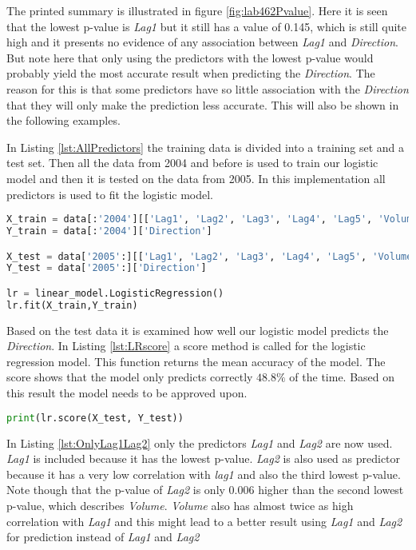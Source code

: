 \FloatBarrier

The printed summary is illustrated in figure \ref{fig:lab462Pvalue}. Here it is  seen that the lowest p-value is \emph{Lag1} but it still has a value of 0.145, which is still quite high and it presents no evidence of any association between \emph{Lag1} and \emph{Direction}. But note here that only using the predictors with the lowest p-value would probably yield the most accurate result when predicting the \emph{Direction}. The reason for this is that some predictors have so little association with the \emph{Direction} that they will only make the prediction less accurate. This will also be shown in the following examples.


In Listing \ref{lst:AllPredictors} the training data is divided into a training set and a test set. Then all the data from 2004 and before is used to train our logistic model and then it is tested on the data from 2005. In this implementation all predictors is used to fit the logistic model.

\begin{lstlisting}[language=Python, label=lst:AllPredictors, caption=Logistic regression using all predictors]
X_train = data[:'2004'][['Lag1', 'Lag2', 'Lag3', 'Lag4', 'Lag5', 'Volume']]
Y_train = data[:'2004']['Direction']

X_test = data['2005':][['Lag1', 'Lag2', 'Lag3', 'Lag4', 'Lag5', 'Volume']]
Y_test = data['2005':]['Direction']

lr = linear_model.LogisticRegression()
lr.fit(X_train,Y_train)
\end{lstlisting}

Based on the test data it is examined how well our logistic model predicts the \emph{Direction}. In Listing \ref{lst:LRscore} a score method is called for the logistic regression model. This function returns the mean accuracy of the model. The score shows that the model only predicts correctly $48.8\%$ of the time. Based on this result the model needs to be approved upon.
\begin{lstlisting}[language=Python, label=lst:LRscore, caption=Print mean accuracy]
print(lr.score(X_test, Y_test))
\end{lstlisting}

In Listing \ref{lst:OnlyLag1Lag2} only the predictors \emph{Lag1} and \emph{Lag2} are now used. \emph{Lag1} is included because it has the lowest p-value. \emph{Lag2} is also used as predictor because it has a very low correlation with \emph{lag1} and also the third lowest p-value.
Note though that the p-value of \emph{Lag2} is only 0.006 higher than the second lowest p-value, which describes \emph{Volume}. \emph{Volume} also has almost twice as high correlation with \emph{Lag1} and this might lead to a better result using \emph{Lag1} and \emph{Lag2} for prediction instead of \emph{Lag1} and \emph{Lag2}

